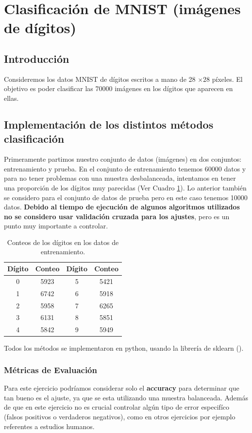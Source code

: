 \documentclass[paper=letter, fontsize=11pt]{scrartcl}
\numberwithin{equation}{section} %
\numberwithin{figure}{section} %
\numberwithin{table}{section} %
\begin{document}
\section{Clasificación de MNIST (imágenes de dígitos) }
\subsection{Introducción}
Consideremos los datos \textsc{MNIST} de dígitos escritos a mano de 28 $\times 28$ píxeles. El objetivo es poder clasificar las 70000 imágenes en los dígitos que aparecen en ellas. 


\subsection{Implementación de los distintos métodos  clasificación}
Primeramente partimos nuestro conjunto de datos (imágenes) en dos conjuntos: entrenamiento y prueba. En el conjunto de entrenamiento tenemos 60000 datos y para no tener problemas con una muestra desbalanceada, intentamos en tener una proporción de los dígitos muy parecidas (Ver Cuadro \ref{tab:cont_train}). Lo anterior también se considero para el conjunto de datos de prueba pero en este caso tenemos 10000 datos. \textbf{Debido al tiempo de ejecución de algunos algoritmos utilizados no se considero usar validación cruzada para los ajustes}, pero es un punto muy importante a controlar. 
\begin{table}[H] 
    \centering
    \begin{tabular}{c|c||c|c}
         Dígito& Conteo &Dígito& Conteo \\ \hline \hline
         0  & 5923 & 5  & 5421\\
         1  & 6742 & 6  & 5918\\
         2  & 5958 & 7  & 6265\\
         3  & 6131 & 8  & 5851\\
         4  & 5842 & 9  & 5949 \\ \hline \hline
    \end{tabular}
    \caption{Conteos de los dígitos en los datos de entrenamiento.}
    \label{tab:cont_train}
\end{table}
Todos los métodos se implementaron en python, usando la librería de sklearn (\cite{scikit-learn}).

\subsubsection{Métricas de Evaluación}
Para este ejercicio podríamos considerar solo el \textbf{accuracy} para determinar que tan bueno es el ajuste, ya que se esta utilizando una muestra balanceada. Además de que en este ejercicio no es crucial controlar algún tipo de error especifíco (falsos positivos o verdaderos negativos), como en otros ejercicios por ejemplo referentes a estudios humanos.\\
\end{document}
